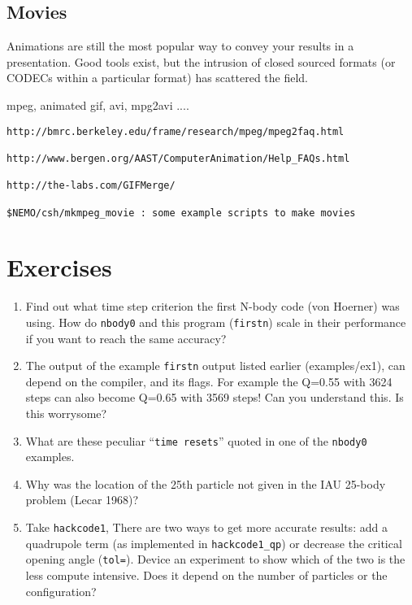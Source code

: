 {\section{Movies}

Animations are still the most popular way to convey your results
in a presentation. Good tools exist, but the intrusion of closed
sourced formats (or CODECs within a particular format)
has scattered the field.

mpeg, animated gif, avi, mpg2avi ....

\begin{verbatim}
http://bmrc.berkeley.edu/frame/research/mpeg/mpeg2faq.html

http://www.bergen.org/AAST/ComputerAnimation/Help_FAQs.html

http://the-labs.com/GIFMerge/

$NEMO/csh/mkmpeg_movie : some example scripts to make movies

\end{verbatim} 
\chapter                {Exercises}

\begin{enumerate}

\item 
Find out what time step criterion the first N-body code (von Hoerner)
was using. How do {\tt nbody0} and this program ({\tt firstn})
scale in their performance if you want to reach the same accuracy?

\item
The output of the example {\tt firstn} output listed earlier
(examples/ex1), can depend on the compiler, and its flags. For example
the Q=0.55 with 3624 steps can also become Q=0.65 with 3569 steps!
Can you understand this. Is this worrysome?



\item
What are these peculiar ``{\tt time resets}'' quoted in one of the {\tt nbody0}
examples.

\item
Why was the location of the 25th particle not given in the IAU 25-body problem
(Lecar 1968)?

\item
Take {\tt hackcode1}, There are two ways to get more accurate results:
add a quadrupole term (as implemented in {\tt hackcode1\_qp}) or decrease
the critical opening angle ({\tt tol=}). Device an experiment to show
which of the two is the less compute intensive. Does it depend on the 
number of particles or the configuration?


\end{enumerate}}
